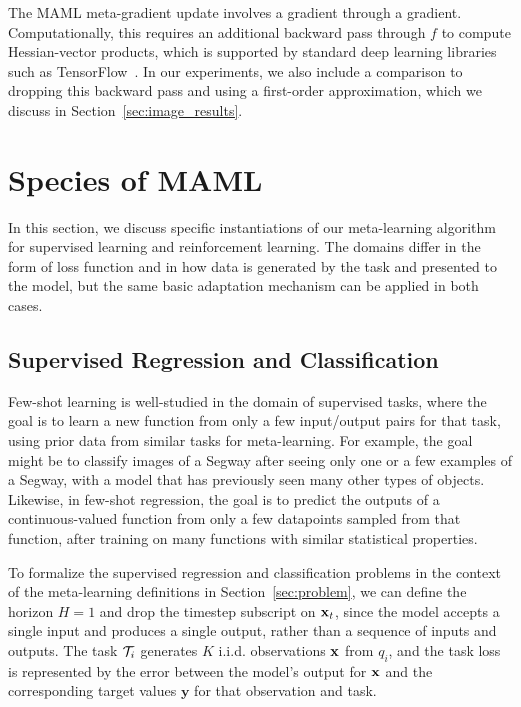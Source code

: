 \documentclass{article}
\begin{document}
The MAML meta-gradient update involves a gradient through a gradient. Computationally, this requires an additional backward pass through $f$ to compute Hessian-vector products, which is supported by standard deep learning libraries such as TensorFlow~\cite{tensorflow}. In our experiments, we also include a comparison to dropping this backward pass and using a first-order approximation, which we discuss in Section~\ref{sec:image_results}.




\vspace{-0.15cm}
\section{Species of MAML}
\label{sec:instantiations}
\vspace{-0.15cm}

In this section, we discuss specific instantiations of our meta-learning algorithm for supervised learning and reinforcement learning. The domains differ in the form of loss function and in how data is generated by the task and presented to the model, but the same basic adaptation mechanism can be applied in both cases.

\vspace{-0.1cm}
\subsection{Supervised Regression and Classification}

\newcommand{\target}{\mathbf{y}}

Few-shot learning is well-studied in the domain of supervised tasks, where the goal is to learn a new function from only a few input/output pairs for that task, using prior data from similar tasks for meta-learning. For example, the goal might be to classify images of a Segway after seeing only one or a few examples of a Segway, with a model that has previously seen many other types of objects. Likewise, in few-shot regression, the goal is to predict the outputs of a continuous-valued function from only a few datapoints sampled from that function, after training on many functions with similar statistical properties.

To formalize the supervised regression and classification problems in the context of the meta-learning definitions in Section~\ref{sec:problem}, we can define the horizon
 $H=1$ and drop the timestep subscript on $\mathbf{x}_t$, since the model accepts a single input and produces a single output, rather than a sequence of inputs and outputs. The task $\mathcal{T}_i$ generates $K$ i.i.d. observations $\mathbf{x}$ from $q_i$, and the task loss is represented by the error between the model's output for $\mathbf{x}$ and the corresponding target values $\target$ for that observation and task.
  
\end{document}
